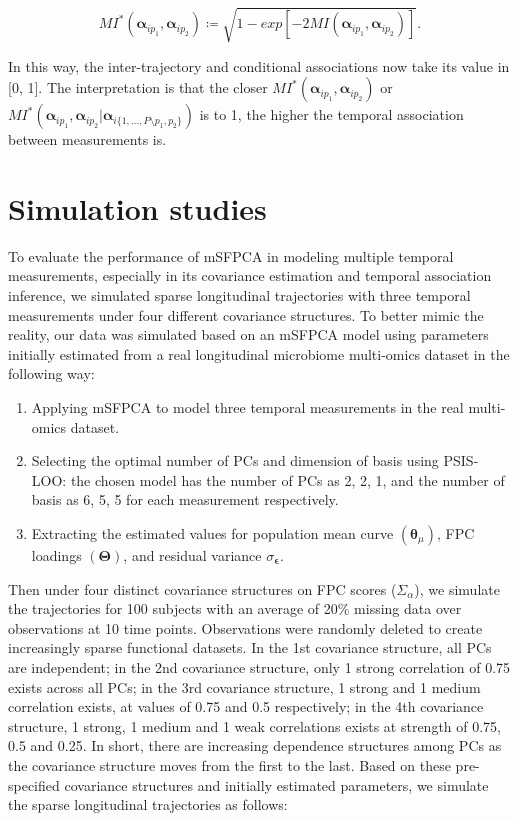 \documentclass[aoas,preprint]{imsart}
\begin{document}
\begin{equation}
MI^*(\boldsymbol{\alpha}_{ip_1}, \boldsymbol{\alpha}_{ip_2}) \coloneqq \sqrt{1-exp[-2MI(\boldsymbol{\alpha}_{ip_1}, \boldsymbol{\alpha}_{ip_2})]}.
\end{equation}

In this way, the inter-trajectory and conditional associations now take its value in [0, 1]. The interpretation is that the closer $MI^*(\boldsymbol{\alpha}_{ip_1}, \boldsymbol{\alpha}_{ip_2})$ or $MI^*(\boldsymbol{\alpha}_{ip_1}, \boldsymbol{\alpha}_{ip_2} | \boldsymbol{\alpha}_{i\{1, ..., P \setminus p_1, p_2 \}})$ is to 1, the higher the temporal association between measurements is. 

\section{Simulation studies}
To evaluate the performance of mSFPCA in modeling multiple temporal measurements, especially in its covariance estimation and temporal association inference, we simulated sparse longitudinal trajectories with three temporal measurements under four different covariance structures. To better mimic the reality, our data was simulated based on an mSFPCA model using parameters initially estimated from a real longitudinal microbiome multi-omics dataset \citep{kostic2015dynamics} in the following way: 

\begin{enumerate}
    \item Applying mSFPCA to model three temporal measurements in the real multi-omics dataset.
    \item Selecting the optimal number of PCs and dimension of basis using PSIS-LOO: the chosen model has the number of PCs as 2, 2, 1, and the number of basis as 6, 5, 5 for each measurement respectively.
    \item Extracting the estimated values for population mean curve $(\boldsymbol\theta_\mu)$, FPC loadings $(\boldsymbol\Theta)$, and residual variance $\sigma_{\boldsymbol\epsilon}$.
\end{enumerate}
	
Then under four distinct covariance structures on FPC scores ($\Sigma_\alpha$), we simulate the trajectories for 100 subjects with an average of 20\% missing data over observations at 10 time points. Observations were randomly deleted to create increasingly sparse functional datasets. In the 1st covariance structure, all PCs are independent; in the 2nd covariance structure, only 1 strong correlation of 0.75 exists across all PCs; in the 3rd covariance structure, 1 strong and 1 medium correlation exists, at values of 0.75 and 0.5 respectively; in the 4th covariance structure, 1 strong, 1 medium and 1 weak correlations exists at strength of 0.75, 0.5 and 0.25. In short, there are increasing dependence structures among PCs as the covariance structure moves from the first to the last. Based on these pre-specified covariance structures and initially estimated parameters, we simulate the sparse longitudinal trajectories as follows:
\end{document}
